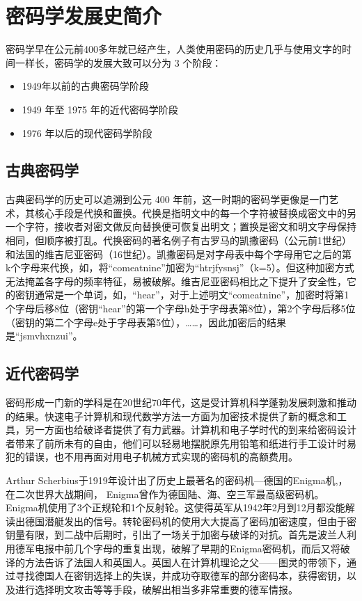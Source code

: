 \chapter{密码学发展史简介}

密码学早在公元前400多年就已经产生，人类使用密码的历史几乎与使用文字的时间一样长，密码学的发展大致可以分为 3 个阶段：
\begin{itemize}
    \item 1949年以前的古典密码学阶段
    \item 1949 年至 1975 年的近代密码学阶段
    \item 1976 年以后的现代密码学阶段
\end{itemize}

\section{古典密码学}
古典密码学的历史可以追溯到公元 400 年前，这一时期的密码学更像是一门艺术，其核心手段是代换和置换。代换是指明文中的每一个字符被替换成密文中的另一个字符，接收者对密文做反向替换便可恢复出明文；置换是密文和明文字母保持相同，但顺序被打乱。代换密码的著名例子有古罗马的凯撒密码（公元前1世纪）和法国的维吉尼亚密码（16世纪）。凯撒密码是对字母表中每个字母用它之后的第k个字母来代换，如，将“comeatnine”加密为“htrjfysnsj”（k=5）。但这种加密方式无法掩盖各字母的频率特征，易被破解。维吉尼亚密码相比之下提升了安全性，它的密钥通常是一个单词，如，“hear”，对于上述明文“comeatnine”，加密时将第1个字母后移8位（密钥“hear”的第一个字母h处于字母表第8位），第2个字母后移5位（密钥的第二个字母e处于字母表第5位），……，因此加密后的结果是“jsmvhxnzui”。

\section{近代密码学}
密码形成一门新的学科是在20世纪70年代，这是受计算机科学蓬勃发展刺激和推动的结果。快速电子计算机和现代数学方法一方面为加密技术提供了新的概念和工具，另一方面也给破译者提供了有力武器。计算机和电子学时代的到来给密码设计者带来了前所未有的自由，他们可以轻易地摆脱原先用铅笔和纸进行手工设计时易犯的错误，也不用再面对用电子机械方式实现的密码机的高额费用。

Arthur Scherbius于1919年设计出了历史上最著名的密码机—德国的Enigma机,，在二次世界大战期间， Enigma曾作为德国陆、海、空三军最高级密码机。Enigma机使用了3个正规轮和1个反射轮。这使得英军从1942年2月到12月都没能解读出德国潜艇发出的信号。转轮密码机的使用大大提高了密码加密速度，但由于密钥量有限，到二战中后期时，引出了一场关于加密与破译的对抗。首先是波兰人利用德军电报中前几个字母的重复出现，破解了早期的Enigma密码机，而后又将破译的方法告诉了法国人和英国人。英国人在计算机理论之父——图灵的带领下，通过寻找德国人在密钥选择上的失误，并成功夺取德军的部分密码本，获得密钥，以及进行选择明文攻击等等手段，破解出相当多非常重要的德军情报。

